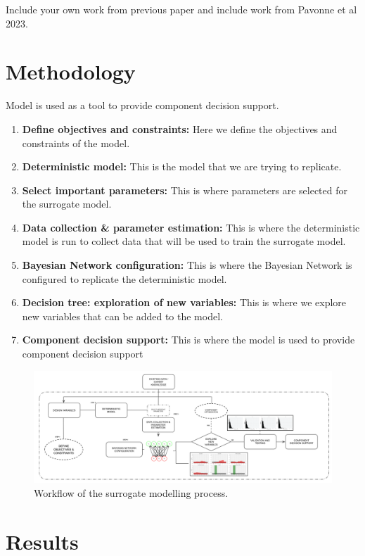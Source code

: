\documentclass[lettersize,journal]{IEEEtran}
\begin{document}
Include your own work from previous paper and include work from Pavonne et al 2023. 

\section{Methodology}\label{sec:methodology}

Model is used as a tool to provide component decision support. 
\begin{enumerate}
    \item \textbf{Define objectives and constraints:} Here we define the objectives and constraints of the model.
    \item \textbf{Deterministic model:} This is the model that we are trying to replicate.
    \item \textbf{Select important parameters:} This is where parameters are selected for the surrogate model.
    \item \textbf{Data collection \& parameter estimation:} This is where the deterministic model is run to collect data that will be used to train the surrogate model.
    \item \textbf{Bayesian Network configuration:} This is where the Bayesian Network is configured to replicate the deterministic model.
    \item \textbf{Decision tree: exploration of new variables:} This is where we explore new variables that can be added to the model. 
    \item \textbf{Component decision support:} This is where the model is used to provide component decision support 
\end{enumerate}

\begin{figure}[t]
    \centering
    \includegraphics[width=\textwidth]{figures/worflow_new.png}
    \caption{Workflow of the surrogate modelling process.}\label{fig:workflow}
\end{figure}

\section{Results}\label{sec:Results} 
\end{document}
